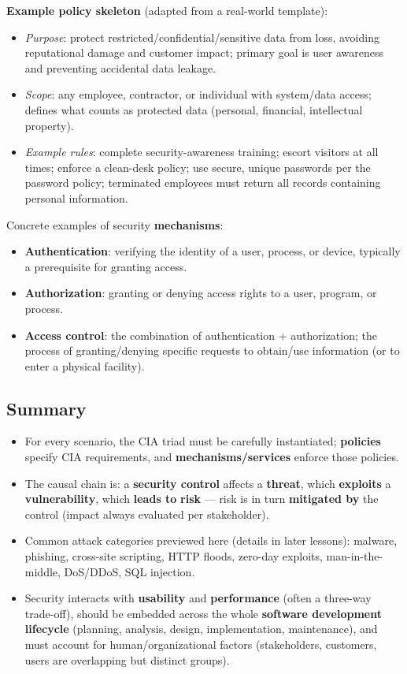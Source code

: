 \documentclass[12pt, a4paper]{article}
\begin{document}
\textbf{Example policy skeleton} (adapted from a real-world template):
\begin{itemize}
    \item \emph{Purpose}: protect restricted/confidential/sensitive data from loss, avoiding reputational damage and customer impact; primary goal is user awareness and preventing accidental data leakage.
    \item \emph{Scope}: any employee, contractor, or individual with system/data access; defines what counts as protected data (personal, financial, intellectual property).
    \item \emph{Example rules}: complete security-awareness training; escort visitors at all times; enforce a clean-desk policy; use secure, unique passwords per the password policy; terminated employees must return all records containing personal information.
\end{itemize}

Concrete examples of security \textbf{mechanisms}:
\begin{itemize}
    \item \textbf{Authentication}: verifying the identity of a user, process, or device, typically a prerequisite for granting access.
    \item \textbf{Authorization}: granting or denying access rights to a user, program, or process.
    \item \textbf{Access control}: the combination of authentication + authorization; the process of granting/denying specific requests to obtain/use information (or to enter a physical facility).
\end{itemize}

\subsection{Summary}
\begin{itemize}
    \item For every scenario, the CIA triad must be carefully instantiated; \textbf{policies} specify CIA requirements, and \textbf{mechanisms/services} enforce those policies.
    \item The causal chain is: a \textbf{security control} affects a \textbf{threat}, which \textbf{exploits} a \textbf{vulnerability}, which \textbf{leads to} \textbf{risk} — risk is in turn \textbf{mitigated by} the control (impact always evaluated per stakeholder).
    \item Common attack categories previewed here (details in later lessons): malware, phishing, cross-site scripting, HTTP floods, zero-day exploits, man-in-the-middle, DoS/DDoS, SQL injection.
    \item Security interacts with \textbf{usability} and \textbf{performance} (often a three-way trade-off), should be embedded across the whole \textbf{software development lifecycle} (planning, analysis, design, implementation, maintenance), and must account for human/organizational factors (stakeholders, customers, users are overlapping but distinct groups).
\end{itemize}
\end{document}
